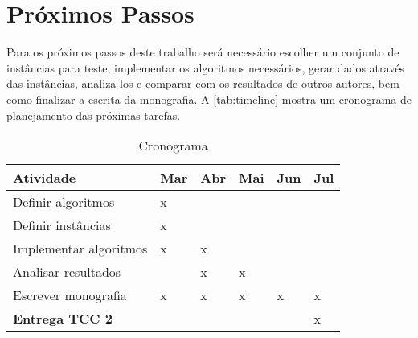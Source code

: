 \chapter{Próximos Passos}\label{ch:proximos-passos}

Para os próximos passos deste trabalho será necessário escolher um conjunto de instâncias para teste, implementar os algoritmos necessários, gerar dados através das instâncias, analiza-los e comparar com os resultados de outros autores, bem como finalizar a escrita da monografia.
A \autoref{tab:timeline} mostra um cronograma de planejamento das próximas tarefas.

\begin{table}[h!]
    \begin{tabularx}{\textwidth}{|l|X|X|X|X|X|}
        \hline
        \textbf{Atividade}                                & Mar & Abr & Mai & Jun & Jul \\
        \hline
        \multicolumn{1}{|p{6em}|}{Definir algoritmos}     & x   &     &     &     &     \\
        \hline
        \multicolumn{1}{|p{6em}|}{Definir instâncias}     & x   &     &     &     &     \\
        \hline
        \multicolumn{1}{|p{6em}|}{Implementar algoritmos} & x   & x   &     &     &     \\
        \hline
        \multicolumn{1}{|p{6em}|}{Analisar resultados}    &     & x   & x   &     &     \\
        \hline
        \multicolumn{1}{|p{6em}|}{Escrever monografia}    & x   & x   & x   & x   & x   \\
        \hline
        \multicolumn{1}{|p{6em}|}{\textbf{Entrega TCC 2}} &     &     &     &     & x   \\
        \hline
    \end{tabularx}
    \caption{Cronograma}
    \label{tab:timeline}
\end{table}
